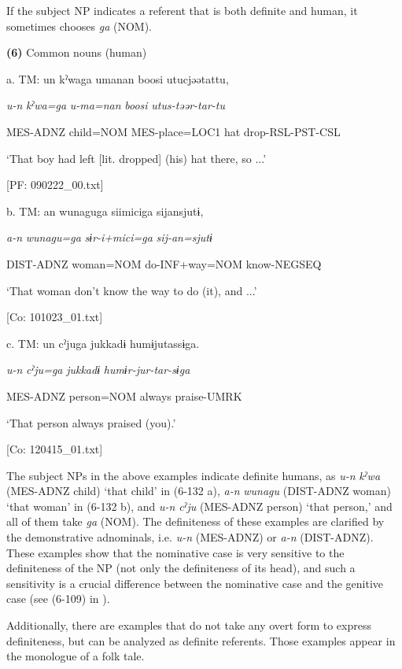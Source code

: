 If the subject NP indicates a referent that is both definite and human, it sometimes chooses \textit{ga} (NOM).

\textbf{(6)}  Common nouns (human)

  a.  TM:  un  kˀwaga  umanan  {\textbar}boosi{\textbar}  utucjəətattu,

      \textit{u-n}  \textit{kˀwa=ga}  \textit{u-ma=nan}  \textit{boosi}  \textit{utus-təər-tar-tu}

      MES-ADNZ  child=NOM  MES-place=LOC1  hat  drop-RSL-PST-CSL

      ‘That boy had left [lit. dropped] (his) hat there, so ...’

      [PF: 090222\_00.txt]

  b.  TM:  an  wunaguga  siimiciga  sijansjutɨ,

      \textit{a-n}  \textit{wunagu=ga}  \textit{sɨr-i+mici=ga}  \textit{sij-an=sjutɨ}

      DIST-ADNZ  woman=NOM  do-INF+way=NOM  know-NEGSEQ

      ‘That woman don’t know the way to do (it), and ...’

      [Co: 101023\_01.txt]

  c.  TM:  un  cˀjuga  jukkadɨ  humɨjutassɨga.

      \textit{u-n}  \textit{cˀju=ga}  \textit{jukkadɨ}  \textit{humɨr-jur-tar-sɨga}

      MES-ADNZ  person=NOM  always  praise-UMRK

      ‘That person always praised (you).’

      [Co: 120415\_01.txt]

The subject NPs in the above examples indicate definite humans, as \textit{u-n} \textit{kˀwa} (MES-ADNZ child) ‘that child’ in (6-132 a), \textit{a-n} \textit{wunagu} (DIST-ADNZ woman) ‘that woman’ in (6-132 b), and \textit{u-n} \textit{cˀju} (MES-ADNZ person) ‘that person,’ and all of them take \textit{ga} (NOM). The definiteness of these examples are clarified by the demonstrative adnominals, i.e. \textit{u-n} (MES-ADNZ) or \textit{a-n} (DIST-ADNZ). These examples show that the nominative case is very sensitive to the definiteness of the NP (not only the definiteness of its head), and such a sensitivity is a crucial difference between the nominative case and the genitive case (see (6-109) in ).

  Additionally, there are examples that do not take any overt form to express definiteness, but can be analyzed as definite referents. Those examples appear in the monologue of a folk tale.

